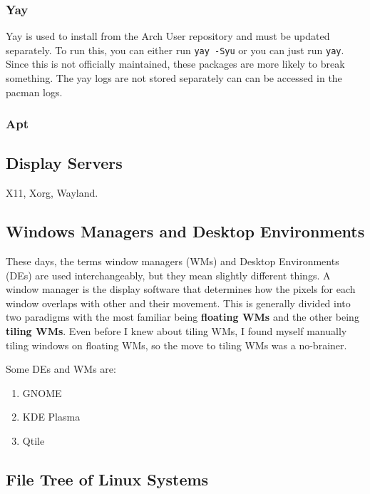 \documentclass{article}
\begin{document}
    \subsubsection{Yay}

      Yay is used to install from the Arch User repository and must be updated separately. To run this, you can either run \texttt{yay -Syu} or you can just run \texttt{yay}. Since this is not officially maintained, these packages are more likely to break something. The yay logs are not stored separately can can be accessed in the pacman logs. 

    \subsubsection{Apt}  
  
  \subsection{Display Servers}

    X11, Xorg, Wayland.

  \subsection{Windows Managers and Desktop Environments}

  These days, the terms window managers (WMs) and Desktop Environments (DEs) are used interchangeably, but they mean slightly different things. A window manager is the display software that determines how the pixels for each window overlaps with other and their movement. This is generally divided into two paradigms with the most familiar being \textbf{floating WMs} and the other being \textbf{tiling WMs}. Even before I knew about tiling WMs, I found myself manually tiling windows on floating WMs, so the move to tiling WMs was a no-brainer. 
  
  Some DEs and WMs are: 
  \begin{enumerate}
    \item GNOME 
    \item KDE Plasma
    \item Qtile
  \end{enumerate}

  \subsection{File Tree of Linux Systems}
\end{document}
